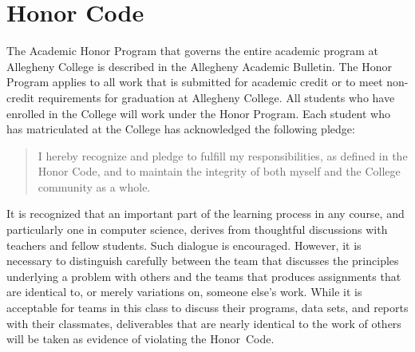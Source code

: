 \vspace*{-.15in}

\section*{Honor Code}

The Academic Honor Program that governs the entire academic program at Allegheny College is described in the Allegheny
Academic Bulletin.  The Honor Program applies to all work that is submitted for academic credit or to meet non-credit
requirements for graduation at Allegheny College.  All students who have enrolled in the College will work under the
Honor Program.  Each student who has matriculated at the College has acknowledged the following pledge:

\vspace*{-.1in}
\begin{quote}
I hereby recognize and pledge to fulfill my responsibilities, as defined in the Honor Code, and to maintain the
integrity of both myself and the College community as a whole.
\end{quote}
\vspace*{-.1in}

\noindent It is recognized that an important part of the learning process in any course, and particularly one in
computer science, derives from thoughtful discussions with teachers and fellow students.  Such dialogue is encouraged.
However, it is necessary to distinguish carefully between the team that discusses the principles underlying a problem
with others and the teams that produces assignments that are identical to, or merely variations on, someone else's
work.  While it is acceptable for teams in this class to discuss their programs, data sets, and reports with their
classmates, deliverables that are nearly identical to the work of others will be taken as evidence of violating the
\mbox{Honor Code}.



